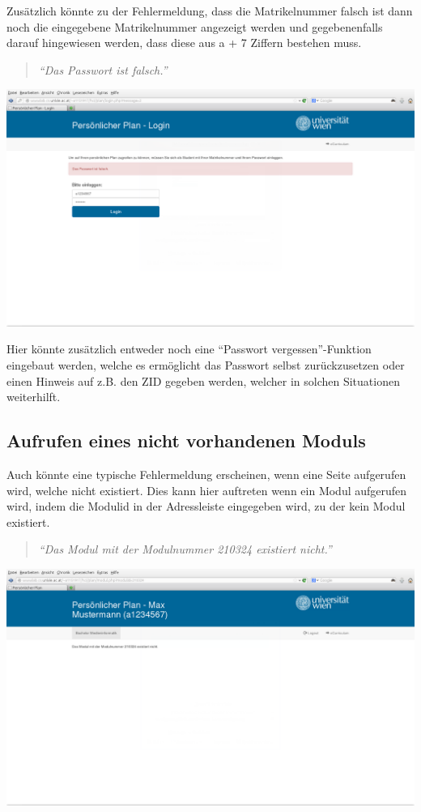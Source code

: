 \documentclass[a4paper,10pt]{scrartcl}
\begin{document}
Zusätzlich könnte zu der Fehlermeldung, dass die Matrikelnummer falsch ist dann noch die eingegebene Matrikelnummer angezeigt werden und gegebenenfalls darauf hingewiesen
werden, dass diese aus a + 7 Ziffern bestehen muss.

\begin{quote}
 \textit{``Das Passwort ist falsch.''}
\end{quote} 

\begin{center}
 \includegraphics[scale=0.4]{./fehlermeldung3.png}
\end{center}

Hier könnte zusätzlich entweder noch eine ``Passwort vergessen''-Funktion eingebaut werden, welche es ermöglicht das Passwort selbst zurückzusetzen oder einen
Hinweis auf z.B. den ZID gegeben werden, welcher in solchen Situationen weiterhilft.

\subsection{Aufrufen eines nicht vorhandenen Moduls}

Auch könnte eine typische Fehlermeldung erscheinen, wenn eine Seite aufgerufen wird, welche nicht existiert. Dies kann hier auftreten wenn ein Modul aufgerufen wird, indem die Modulid in der Adressleiste
eingegeben wird, zu der kein Modul existiert.

\begin{quote}
 \textit{``Das Modul mit der Modulnummer 210324 existiert nicht.''}
\end{quote} 

\begin{center}
 \includegraphics[scale=0.4]{./fehlermeldung4.png}
\end{center}
\end{document}
